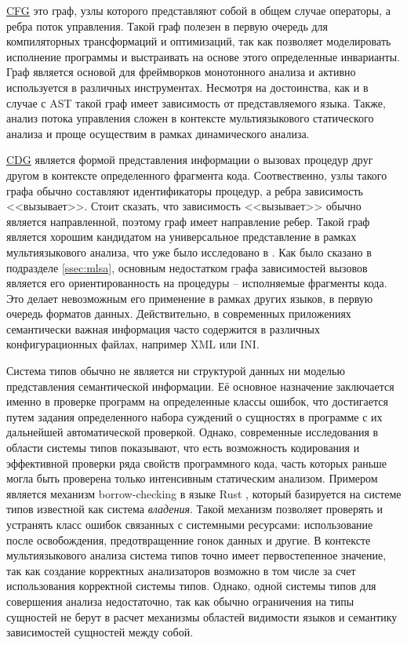 \hyperlink{CFG}{CFG} это граф, узлы которого представляют собой в общем случае операторы, а ребра
поток управления. Такой граф полезен в первую очередь для компиляторных трансформаций и оптимизаций,
так как позволяет моделировать исполнение программы и выстраивать на основе этого определенные инварианты.
Граф является основой для фреймворков монотонного анализа \cite{static-program-analysis} и активно
используется в различных инструментах. Несмотря на достоинства, как и в случае с AST такой граф
имеет зависимость от представляемого языка. Также, анализ потока управления сложен в контексте
мультиязыкового статического анализа и проще осуществим в рамках динамического анализа.

\hyperlink{CDG}{CDG} является формой представления информации о вызовах процедур друг другом в контексте
определенного фрагмента кода. Соотвественно, узлы такого графа обычно составляют идентификаторы
процедур, а ребра зависимость <<вызывает>>. Стоит сказать, что зависимость <<вызывает>> обычно является
направленной, поэтому граф имеет направление ребер. Такой граф является хорошим кандидатом на универсальное
представление в рамках мультиязыкового анализа, что уже было исследовано в \cite{MLSA}. Как было
сказано в подразделе \ref{ssec:mlsa}, основным недостатком графа зависимостей вызовов является
его ориентированность на процедуры -- исполняемые фрагменты кода. Это делает невозможным его применение
в рамках других языков, в первую очередь форматов данных. Действительно, в современных приложениях
семантически важная информация часто содержится в различных конфигурационных файлах, например XML или
INI.

Система типов обычно не является ни структурой данных ни моделью представления семантической информации.
Её основное назначение заключается именно в проверке программ на определенные классы ошибок,
что достигается путем задания определенного набора суждений о сущностях в программе с
их дальнейшей автоматической проверкой.
Однако, современные исследования в области системы типов показывают, что
есть возможность кодирования и эффективной проверки ряда свойств программного кода, часть
которых раньше могла быть проверена только интенсивным статическим анализом. Примером является
механизм borrow-checking в языке Rust \cite{rust}, который базируется на системе типов известной
как система \textit{владения}. Такой механизм позволяет проверять и устранять класс ошибок связанных
с системными ресурсами: использование после освобождения, предотвращенние гонок данных и другие.
В контексте мультиязыкового анализа система типов точно имеет первостепенное значение, так
как создание корректных анализаторов возможно в том числе за счет использования корректной
системы типов. Однако, одной системы типов для совершения анализа недостаточно, так как
обычно ограничения на типы сущностей не берут в расчет механизмы областей видимости языков
и семантику зависимостей сущностей между собой.

